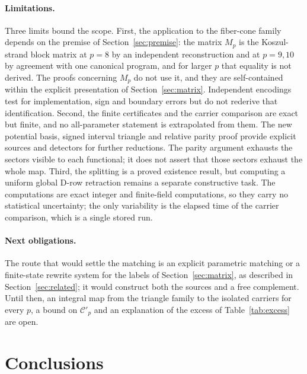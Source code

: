 \documentclass[11pt]{article}
\theoremstyle{definition}
\theoremstyle{remark}
\begin{document}
\paragraph{Limitations.}
Three limits bound the scope. First, the application to the fiber-cone family
depends on the premise of Section~\ref{sec:premise}: the matrix $M_p$ is
the Koszul-strand block matrix at $p=8$ by an independent reconstruction and at $p=9,10$
by agreement with one canonical program, and for larger $p$
that equality is not derived. The proofs concerning $M_p$ do not use it, and they
are self-contained within the explicit presentation of Section~\ref{sec:matrix}.
Independent encodings test for implementation,
sign and boundary errors but do not rederive that identification. Second, the finite
certificates and the carrier comparison are exact but finite, and no all-parameter
statement is extrapolated from them. The new potential basis, signed
interval triangle and relative parity proof provide explicit sources and
detectors for further reductions. The parity argument exhausts the sectors
visible to each functional; it does not assert that those sectors exhaust
the whole map. Third, the splitting is a proved existence result, but computing
a uniform global D-row retraction remains a separate constructive task. The
computations are exact integer and finite-field computations, so they carry no
statistical uncertainty; the only variability is the elapsed time of the carrier
comparison, which is a single stored run.

\paragraph{Next obligations.} The route that would settle the matching is an explicit
parametric matching or a finite-state rewrite system for the labels of
Section~\ref{sec:matrix}, as described in Section~\ref{sec:related}; it would construct
both the sources and a free complement. Until then, an integral map from the triangle
family to the isolated carriers for every $p$, a bound on $\mathcal C'_p$ and an
explanation of the excess of Table~\ref{tab:excess} are open.

\section{Conclusions}\label{sec:conclusions}
\end{document}
